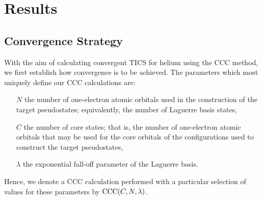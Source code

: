 \documentclass[]{article}
\begin{document}
\clearpage

\section{Results}
\label{sec:re}

\subsection{Convergence Strategy}
\label{sec:re-conv}


With the aim of calculating convergent TICS for helium using the CCC method,
we first establish how convergence is to be achieved.
The parameters which most uniquely define our CCC calculations are:
\begin{itemize}
\item[$N$]
  the number of one-electron atomic orbitals used in the construction of the
  target pseudostates; equivalently, the number of Laguerre basis states,
\item[$C$]
  the number of core states; that is, the number of one-electron atomic orbitals
  that may be used for the core orbitals of the configurations used to
  construct the target pseudostates,
\item[$\lambda$]
  the exponential fall-off parameter of the Laguerre basis.
\end{itemize}
Hence, we denote a CCC calculation performed with a particular selection of
values for these parameters by $\mathrm{CCC}(C, N, \lambda)$.

\end{document}
